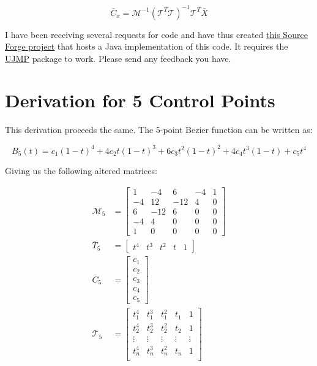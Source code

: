 \documentclass{article}
\begin{document}
\[\bar{C}_x = \mathcal{M}^{-1}(\mathcal{T}^T\mathcal{T})^{-1}\mathcal{T}^T\bar{X}\]

I have been receiving several requests for code and have thus created \href{http://sourceforge.net/projects/lsbezier/}{this Source Forge project} that hosts a Java implementation of this code.  It requires the \href{http://sourceforge.net/projects/ujmp/}{UJMP} package to work. Please send any feedback you have.

\section{Derivation for 5 Control Points}

This derivation proceeds the same.  The 5-point Bezier function can be written as:

\[B_5(t) = c_1(1-t)^4 + 4c_2t(1-t)^3 + 6c_3t^2(1-t)^2 + 4c_4t^3(1-t) + c_5t^4\]

Giving us the following altered matrices:

\begin{align*}
  \mathcal{M}_5 &= \left[
    \begin{array}{rrrrr}
       1 & - 4 &   6 & -4 & 1 \\
      -4 &  12 & -12 &  4 & 0 \\
       6 & -12 &   6 &  0 & 0 \\
      -4 &   4 &   0 &  0 & 0 \\
       1 &   0 &   0 &  0 & 0
    \end{array}
  \right] \\
  \bar{T}_5 &= \left[\begin{array}{ccccc}t^4 & t^3 & t^2 & t & 1\end{array}\right] \\
  \bar{C}_5 &= \left[\begin{array}{r}c_1\\c_2\\c_3\\c_4\\c_5\end{array}\right] \\
  \mathcal{T}_5 &= \left[
    \begin{array}{ccccc}
       t_1^4 &  t_1^3 &  t_1^2 &  t_1   &      1 \\
       t_2^4 &  t_2^3 &  t_2^2 &  t_2   &      1 \\
      \vdots & \vdots & \vdots & \vdots & \vdots \\
       t_n^4 &  t_n^3 &  t_n^2 &  t_n   &      1 \\
    \end{array}
  \right]
\end{align*}
\end{document}
